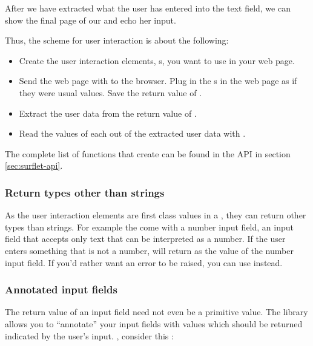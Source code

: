 After we have extracted what the user has entered into the text field,
we can show the final page of our \surflet and echo her input.

Thus, the scheme for user interaction is about the following:

\begin{itemize}
\item Create the user interaction elements, s, you
want to use in your web page.
\item Send the web page with  to the browser.
Plug in the s in the web page as if they were usual
values.  Save the return value of .
\item Extract the user data from the return value of
.
\item Read the values of each  out of the extracted
user data with .
\end{itemize}

The complete list of functions that create  can be
found in the API in section \ref{sec:surflet-api}.

\subsubsection{Return types other than strings}
\label{subsec:input-return}

As the user interaction elements are first class values in a \surflet,
they can return other types than strings.  For example the \surflets
come with a number input field, \ie an input field that accepts only
text that can be interpreted as a number.  If the user enters
something that is not a number,  will return
\sharpf as the value of the number input field.  If you'd rather want
an error to be raised, you can use 
instead.

\subsubsection{Annotated input fields}

The return value of an input field need not even be a primitive
value.  The \surflets library allows you to ``annotate'' your input
fields with values which should be returned indicated by the user's
input.  \Eg, consider this \surflet:

